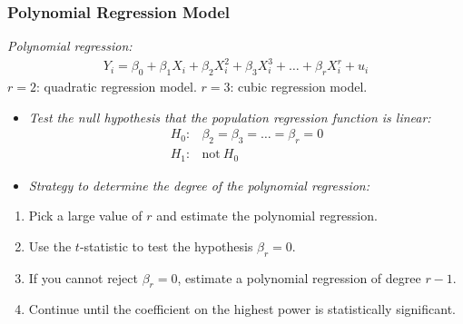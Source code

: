 

\begin{frame}
\frametitle{Polynomial Regression Model}
\emph{Polynomial regression:}
\begin{align*}
Y_{i} = \beta_{0} + \beta_{1} X_{i} + \beta_{2} X_{i}^{2} + \beta_{3} X_{i}^{3} + \ldots + \beta_{r} X_{i}^{r} + u_{i}
\end{align*}
\quad
$r=2$: \quad quadratic regression model.
\newlinequad
$r=3$: \quad cubic regression model.
\begin{itemize} 
\item \emph{Test the null hypothesis that the population regression function is linear:}
\begin{align*}
H_{0}\colon & 
\beta_{2} = \beta_{3} = \ldots = \beta_{r} = 0\\
H_{1}\colon & 
\text{not}~H_{0}
\end{align*}
\item \emph{Strategy to determine the degree of the polynomial regression:}
\end{itemize}
\begin{enumerate}
\item Pick a large value of $r$ and estimate the polynomial regression.
\item Use the $t$-statistic to test the hypothesis $\beta_{r}=0$.
\item If you cannot reject $\beta_{r}=0$, estimate a polynomial regression of degree $r-1$. 
\item Continue until the coefficient on the highest power is statistically significant.
\end{enumerate}
\end{frame}
